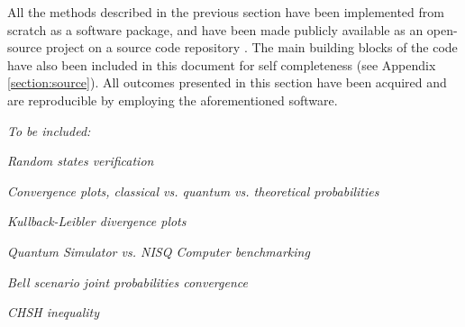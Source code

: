 All the methods described in the previous section have been implemented from scratch as a software package, and have been made publicly available as an open-source project on a source code repository \cite{software2023}. The main building blocks of the code have also been included in this document for self completeness (see Appendix \ref{section:source}). All outcomes presented in this section have been acquired and are reproducible by employing the aforementioned software.

\textit{To be included:}

\textit{Random states verification}

\textit{Convergence plots, classical vs. quantum vs. theoretical probabilities}

\textit{Kullback-Leibler divergence plots}

\textit{Quantum Simulator vs. NISQ Computer benchmarking}

\textit{Bell scenario joint probabilities convergence}

\textit{CHSH inequality}